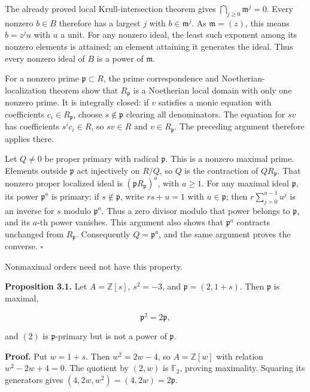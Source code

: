 \documentclass[
]{article}
\begin{document}
The already proved local Krull-intersection theorem gives
\(\bigcap_{j\ge0}\mathfrak m^j=0\). Every nonzero \(b\in B\) therefore
has a largest \(j\) with \(b\in\mathfrak m^j\). As \(\mathfrak m=(z)\),
this means \(b=z^j u\) with \(u\) a unit. For any nonzero ideal, the
least such exponent among its nonzero elements is attained; an element
attaining it generates the ideal. Thus every nonzero ideal of \(B\) is a
power of \(\mathfrak m\).

For a nonzero prime \(\mathfrak p\subset R\), the prime correspondence
and Noetherian-localization theorem show that \(R_{\mathfrak p}\) is a
Noetherian local domain with only one nonzero prime. It is integrally
closed: if \(v\) satisfies a monic equation with coefficients
\(c_i\in R_{\mathfrak p}\), choose \(s\notin\mathfrak p\) clearing all
denominators. The equation for \(sv\) has coefficients \(s^ic_i\in R\),
so \(sv\in R\) and \(v\in R_{\mathfrak p}\). The preceding argument
therefore applies there.

Let \(Q\ne0\) be proper primary with radical \(\mathfrak p\). This is a
nonzero maximal prime. Elements outside \(\mathfrak p\) act injectively
on \(R/Q\), so \(Q\) is the contraction of \(QR_{\mathfrak p}\). That
nonzero proper localized ideal is \((\mathfrak pR_{\mathfrak p})^a\),
with \(a\ge1\). For any maximal ideal \(\mathfrak p\), its power
\(\mathfrak p^a\) is primary: if \(s\notin\mathfrak p\), write
\(rs+u=1\) with \(u\in\mathfrak p\); then \(r\sum_{j=0}^{a-1}u^j\) is an
inverse for \(s\) modulo \(\mathfrak p^a\). Thus a zero divisor modulo
that power belongs to \(\mathfrak p\), and its \(a\)-th power vanishes.
This argument also shows that \(\mathfrak p^a\) contracts unchanged from
\(R_{\mathfrak p}\). Consequently \(Q=\mathfrak p^a\), and the same
argument proves the converse. \(\square\)

Nonmaximal orders need not have this property.

\textbf{Proposition 3.1.} Let \(A=\mathbb Z[s]\), \(s^2=-3\), and
\(\mathfrak p=(2,1+s)\). Then \(\mathfrak p\) is maximal,

\[
\mathfrak p^2=2\mathfrak p,
\]

and \((2)\) is \(\mathfrak p\)-primary but is not a power of
\(\mathfrak p\).

\textbf{Proof.} Put \(w=1+s\). Then \(w^2=2w-4\), so \(A=\mathbb Z[w]\)
with relation \(w^2-2w+4=0\). The quotient by \((2,w)\) is
\(\mathbb F_2\), proving maximality. Squaring its generators gives
\((4,2w,w^2)=(4,2w)=2\mathfrak p\).
\end{document}
